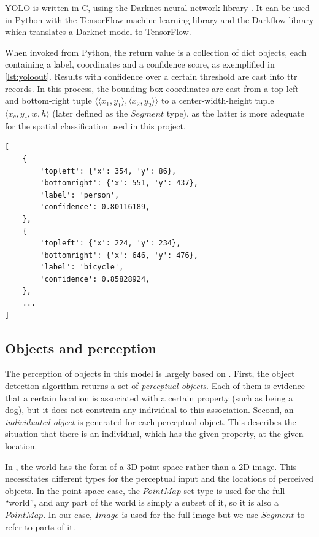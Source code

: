YOLO is written in C, using the Darknet neural network library \citep{darknet13}.
It can be used in Python with the TensorFlow machine learning library and the Darkflow library which translates a Darknet model to TensorFlow.

When invoked from Python, the return value is a collection of dict objects, each containing a label, coordinates and a confidence score, as exemplified in \autoref{lst:yoloout}.
Results with confidence over a certain threshold are cast into \gls{ttr} records.
In this process, the bounding box coordinates are cast from a top-left and bottom-right tuple $\langle\langle x_1, y_1\rangle, \langle x_2, y_2\rangle\rangle$ to a center-width-height tuple $\langle x_c, y_c, w, h\rangle$ (later defined as the $Segment$ type), as the latter is more adequate for the spatial classification used in this project.

\begin{lstlisting}[label=lst:yoloout, caption=Example output of YOLO invocation]
[
    {
        'topleft': {'x': 354, 'y': 86},
        'bottomright': {'x': 551, 'y': 437},
        'label': 'person',
        'confidence': 0.80116189,
    },
    {
        'topleft': {'x': 224, 'y': 234},
        'bottomright': {'x': 646, 'y': 476},
        'label': 'bicycle',
        'confidence': 0.85828924,
    },
	...
]
\end{lstlisting}



\subsection{Objects and perception}

The perception of objects in this model is largely based on \cite{lspc}.
First, the object detection algorithm returns a set of \textit{perceptual objects}.
Each of them is evidence that a certain location is associated with a certain property (such as being a dog), but it does not constrain any individual to this association.
Second, an \textit{individuated object} is generated for each perceptual object.
This describes the situation that there is an individual, which has the given property, at the given location.

In \cite{lspc}, the world has the form of a 3D point space rather than a 2D image.
This necessitates different types for the perceptual input and the locations of perceived objects.
In the point space case, the $PointMap$ set type is used for the full ``world'', and any part of the world is simply a subset of it, so it is also a $PointMap$.
In our case, $Image$ is used for the full image but we use $Segment$ to refer to parts of it.



